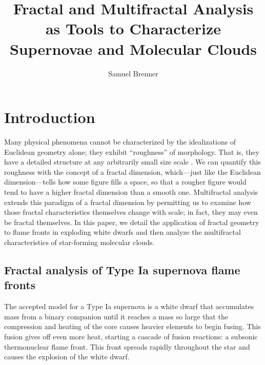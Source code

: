 \documentclass{emulateapj}
\begin{document}
%
\title{Fractal and Multifractal Analysis as Tools to Characterize Supernovae and Molecular Clouds}
%
\author{Samuel Brenner}
%
%
%
%
%
\begin{abstract}
\end{abstract}
%
%
%
%
%
%

\section{Introduction}
Many physical phenomena cannot be characterized by the idealizations of Euclidean geometry alone; they exhibit ``roughness'' of morphology. That is, they have a detailed structure at any arbitrarily small size scale \citep[see][]{Falconer2003}. We can quantify this roughness with the concept of a fractal dimension, which---just like the Euclidean dimension---tells how some figure fills a space, so that a rougher figure would tend to have a higher fractal dimension than a smooth one. Multifractal analysis extends this paradigm of a fractal dimension by permitting us to examine how those fractal characteristics themselves change with scale; in fact, they may even be fractal themselves. In this paper, we detail the application of fractal geometry to flame fronts in exploding white dwarfs and then analyze the multifractal characteristics of star-forming molecular clouds.

\subsection{Fractal analysis of Type Ia supernova flame fronts}
The accepted model for a Type Ia supernova is a white dwarf that accumulates mass from a binary companion until it reaches a mass so large that the compression and heating of the core causes heavier elements to begin fusing. This fusion gives off even more heat, starting a cascade of fusion reactions: a subsonic thermonuclear flame front. This front spreads rapidly throughout the star and causes the explosion of the white dwarf.
\end{document}
